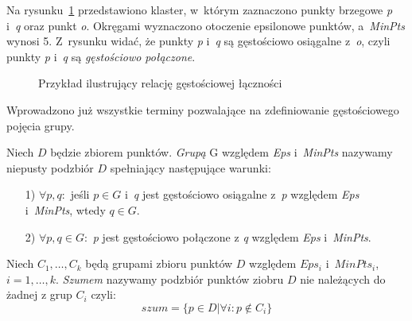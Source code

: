 Na rysunku~\ref{rys:3} przedstawiono  klaster, w~którym zaznaczono punkty brzegowe \emph{p} i~\emph{q} oraz punkt \emph{o}. Okręgami wyznaczono otoczenie epsilonowe punktów, a~\emph{MinPts} wynosi 5. Z~rysunku widać, że punkty \emph{p} i~\emph{q} są gęstościowo osiągalne z~\emph{o}, czyli punkty \emph{p} i~\emph{q} są \emph{gęstościowo połączone}.
\begin{figure}[!h]
\begin{center}
\end{center}
\caption{Przykład ilustrujący relację gęstościowej łączności\label{rys:3}}
\end{figure}

Wprowadzono już wszystkie terminy pozwalające na zdefiniowanie gęstościowego pojęcia grupy. 

Niech $D$ będzie zbiorem punktów. \emph{Grupą} G względem \emph{Eps} i~\emph{MinPts} nazywamy niepusty podzbiór $D$ spełniający następujące warunki:
\begin{enumerate}
\item[    1)]$\forall p,q:$ jeśli $p \in G$ i~\emph{q} jest gęstościowo osiągalne z~\emph{p} względem \emph{Eps} i~\emph{MinPts}, wtedy $q \in G$.
\item[    2)]$\forall p,q \in G:$ \emph{p} jest gęstościowo połączone z \emph{q} względem \emph{Eps} i~\emph{MinPts}.
\end{enumerate}

Niech $C_{1}, \ldots, C_{k}$ będą grupami zbioru punktów $D$ względem $Eps_{i}$ i~$MinPts_{i}$, $i=1, \ldots, k$. \emph{Szumem} nazywamy podzbiór punktów ziobru $D$ nie należących do żadnej z grup $C_{i}$ czyli:
\begin{displaymath}
szum = \lbrace p \in D \vert \forall i:p \notin C_{i}\rbrace
\end{displaymath}

